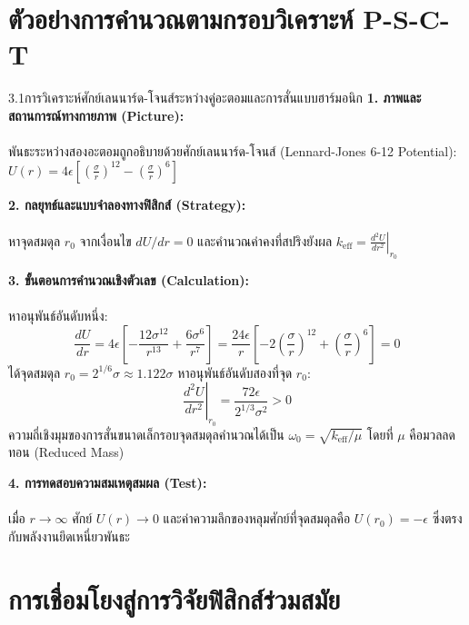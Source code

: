 \section{ตัวอย่างการคำนวณตามกรอบวิเคราะห์ P-S-C-T}

\begin{psctexample}{3.1}{การวิเคราะห์ศักย์เลนนาร์ด-โจนส์ระหว่างคู่อะตอมและการสั่นแบบฮาร์มอนิก}
\textbf{1. ภาพและสถานการณ์ทางกายภาพ (Picture):}\\\\ พันธะระหว่างสองอะตอมถูกอธิบายด้วยศักย์เลนนาร์ด-โจนส์ (Lennard-Jones 6-12 Potential): $U(r) = 4\epsilon \left[\left(\frac{\sigma}{r}\right)^{12} - \left(\frac{\sigma}{r}\right)^6\right]$

\vspace{4pt}
\textbf{2. กลยุทธ์และแบบจำลองทางฟิสิกส์ (Strategy):}\\\\ หาจุดสมดุล $r_0$ จากเงื่อนไข $dU/dr = 0$ และคำนวณค่าคงที่สปริงยังผล $k_{\text{eff}} = \left.\frac{d^2U}{dr^2}\right|_{r_0}$

\vspace{4pt}
\textbf{3. ขั้นตอนการคำนวณเชิงตัวเลข (Calculation):}\\\\ หาอนุพันธ์อันดับหนึ่ง:
\begin{equation}
\frac{dU}{dr} = 4\epsilon \left[ -\frac{12\sigma^{12}}{r^{13}} + \frac{6\sigma^6}{r^7} \right] = \frac{24\epsilon}{r}\left[ -2\left(\frac{\sigma}{r}\right)^{12} + \left(\frac{\sigma}{r}\right)^6 \right] = 0
\end{equation}
ได้จุดสมดุล $r_0 = 2^{1/6}\sigma \approx 1.122\sigma$
หาอนุพันธ์อันดับสองที่จุด $r_0$:
\begin{equation}
\left.\frac{d^2U}{dr^2}\right|_{r_0} = \frac{72\epsilon}{2^{1/3}\sigma^2} > 0
\end{equation}
ความถี่เชิงมุมของการสั่นขนาดเล็กรอบจุดสมดุลคำนวณได้เป็น $\omega_0 = \sqrt{k_{\text{eff}}/\mu}$ โดยที่ $\mu$ คือมวลลดทอน (Reduced Mass)

\vspace{4pt}
\textbf{4. การทดสอบความสมเหตุสมผล (Test):}\\\\ เมื่อ $r \to \infty$ ศักย์ $U(r) \to 0$ และค่าความลึกของหลุมศักย์ที่จุดสมดุลคือ $U(r_0) = -\epsilon$ ซึ่งตรงกับพลังงานยึดเหนี่ยวพันธะ
\end{psctexample}

\section{การเชื่อมโยงสู่การวิจัยฟิสิกส์ร่วมสมัย}

